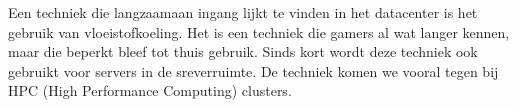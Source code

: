 Een techniek die langzaamaan ingang lijkt te vinden in het datacenter is het gebruik van vloeistofkoeling. Het is een techniek die gamers al wat langer kennen, maar die beperkt bleef tot thuis gebruik. Sinds kort wordt deze techniek ook gebruikt voor servers in de sreverruimte. De techniek komen we vooral tegen bij HPC (High Performance Computing) clusters.
